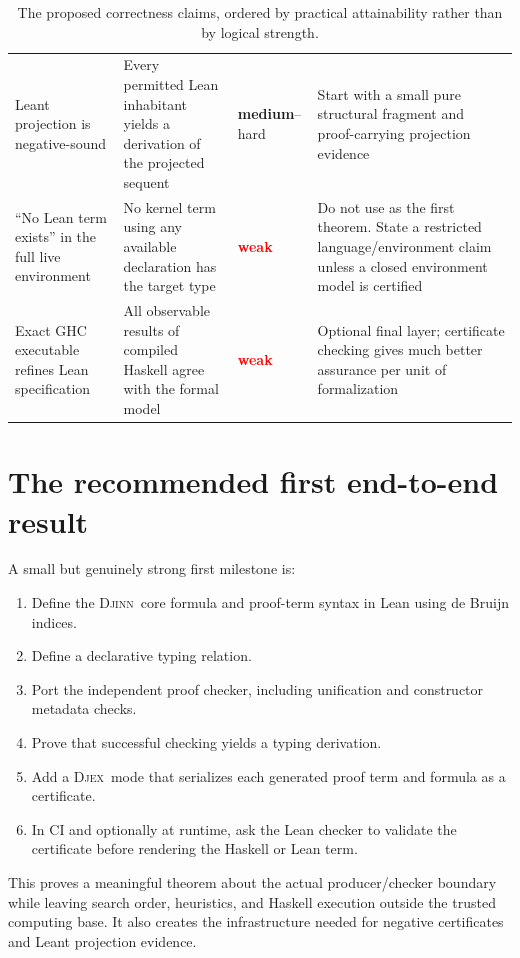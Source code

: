 \documentclass[11pt,letterpaper,openany]{report}
\theoremstyle{definition}
\theoremstyle{remark}
\newcommand{\Djex}{\textsc{Djex}}
\newcommand{\Djinn}{\textsc{Djinn}}
\newcommand{\medium}{\textcolor{Amber}{\textbf{medium}}}
\newcommand{\weak}{\textcolor{Red}{\textbf{weak}}}
\begin{document}
\begin{table}[htbp]
\begin{tabularx}{\textwidth}{L{0.22\textwidth} L{0.31\textwidth} L{0.12\textwidth} Y}
Leant projection is negative-sound & Every permitted Lean inhabitant yields a derivation of the projected sequent & \medium--hard & Start with a small pure structural fragment and proof-carrying projection evidence \\
\addlinespace
``No Lean term exists'' in the full live environment & No kernel term using any available declaration has the target type & \weak & Do not use as the first theorem. State a restricted language/environment claim unless a closed environment model is certified \\
\addlinespace
Exact GHC executable refines Lean specification & All observable results of compiled Haskell agree with the formal model & \weak & Optional final layer; certificate checking gives much better assurance per unit of formalization \\
\bottomrule
\end{tabularx}
\caption{The proposed correctness claims, ordered by practical attainability rather than by logical strength.}
\label{tab:feasibility}
\end{table}

\section{The recommended first end-to-end result}

A small but genuinely strong first milestone is:

\begin{enumerate}
\item Define the \Djinn\ core formula and proof-term syntax in Lean using de Bruijn indices.
\item Define a declarative typing relation.
\item Port the independent proof checker, including unification and constructor metadata checks.
\item Prove that successful checking yields a typing derivation.
\item Add a \Djex\ mode that serializes each generated proof term and formula as a certificate.
\item In CI and optionally at runtime, ask the Lean checker to validate the certificate before rendering the Haskell or Lean term.
\end{enumerate}

This proves a meaningful theorem about the actual producer/checker boundary while leaving search order, heuristics, and Haskell execution outside the trusted computing base. It also creates the infrastructure needed for negative certificates and Leant projection evidence.
\end{document}
